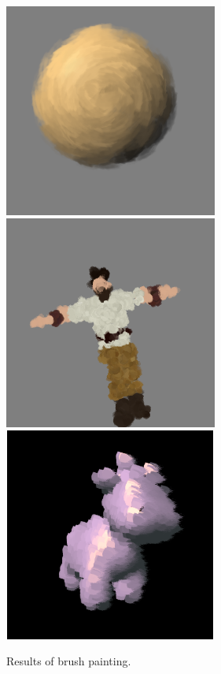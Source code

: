 \begin{figure}[H]
    \begin{center}
    \includegraphics[width=70mm, height=70mm]{Resultats/painting1/final.png}
    \includegraphics[width=70mm, height=70mm]{Resultats/paintChar/final.png}
    \includegraphics[width=70mm, height=70mm]{Resultats/spotPaint.png}
    \end{center}
    \caption{Results of brush painting.}
    \label{results_paint}
\end{figure}

